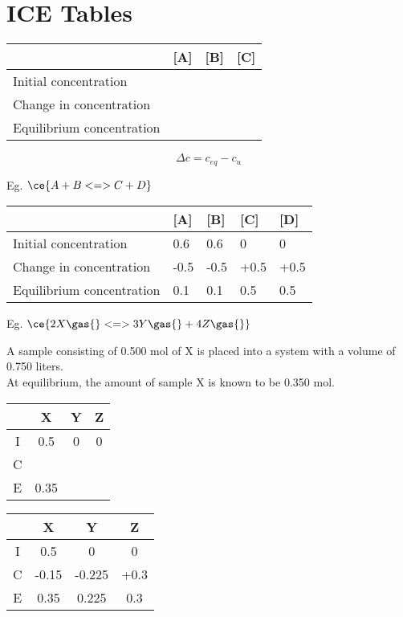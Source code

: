 \section{ICE Tables} \label{6/11/2024}
	\begin{table}[htbp]
		\centering
		\begin{tabular}{|l|l|l|l|}
			\hline
			 & [A] & [B] & [C] \\ \hline
			Initial concentration &  &  &  \\
			Change in concentration &  &  &  \\
			Equilibrium concentration &  &  &  \\ \hline
		\end{tabular}
	\end{table}

	$$\Delta c = c_{eq}- c_{u}$$

	Eg. $\ce{A + B <=> C + D}$

	\begin{table}[htbp]
		\centering
		\begin{tabular}{lllll}
			\hline
			 & [A] & [B] & [C] & [D]  \\ \hline
			Initial concentration 		& 0.6 & 0.6 & 0 & 0 \\
			Change in concentration 	& -0.5 & -0.5 & +0.5 & +0.5 \\
			Equilibrium concentration 	& 0.1 & 0.1 & 0.5 & 0.5 \\ \hline
		\end{tabular}
	\end{table}

\newpage
	Eg. $\ce{2X \gas{} <=> 3Y \gas{} + 4Z \gas{}}$

	A sample consisting of 0.500 mol of X is placed into a system with a volume of 0.750 liters. \\
	At equilibrium, the amount of sample X is known to be 0.350 mol.

	\begin{table}[htbp]
		\centering
		\begin{tabular}{cccc}
			\hline
			 & X & Y & Z \\ \hline
			I 		& 0.5 & 0 & 0 \\
			C 		&  &  & \\
			E 		& 0.35 &  &  \\ \hline
		\end{tabular}
	\end{table}

	\begin{table}[htbp]
		\centering
		\begin{tabular}{cccc}
			\hline
			 	& X & Y & Z \\ \hline
			I 		& 0.5 & 0 & 0 \\
			C 		& -0.15 & -0.225 & +0.3 \\
			E 		& 0.35 & 0.225 & 0.3 \\ \hline
		\end{tabular}
	\end{table}


